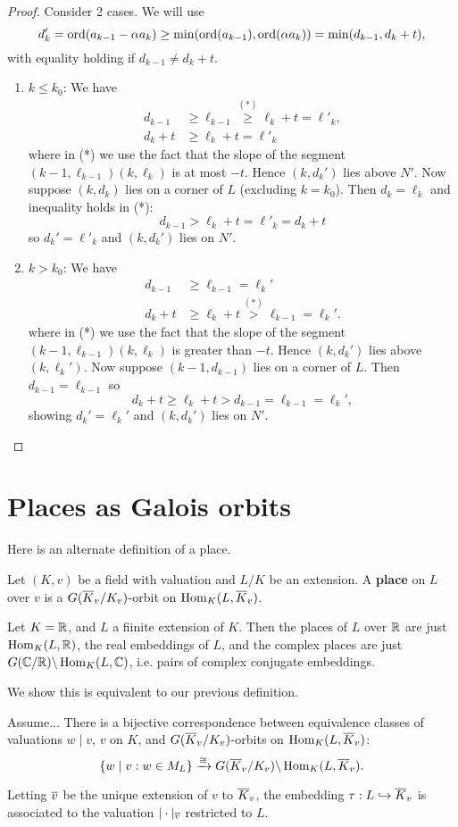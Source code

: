 \begin{proof}
Consider 2 cases. We will use 
\[
d_k'=\operatorname{ord}(a_{k-1}-\alpha a_{k})\ge 
\min(\operatorname{ord}(a_{k-1}),\operatorname{ord}(\alpha a_{k}))=\min(d_{k-1},d_k+t),
\]
with equality holding if $d_{k-1}\ne d_k+t$.
\begin{enumerate}
\item $k\le k_0$: We have
\begin{align*}
d_{k-1}& \ge \ell_{k-1}\stackrel{(*)}{\ge} \ell_k+t=\ell'_k,\\
d_k+t& \ge \ell_k+t= \ell'_k
\end{align*}
where in (*) we use the fact that the slope of the segment $(k-1,\ell_{k-1})(k,\ell_k)$ is at most $-t$. 
Hence $(k,d_k')$ lies above $N'$. Now suppose $(k,d_k)$ lies on a corner of $L$ (excluding $k=k_0$). Then $d_k=\ell_k$ and inequality holds in (*):
\[
d_{k-1}>\ell_k+t=\ell'_k=d_k+t
\]
so $d_k'=\ell'_k$ and $(k,d_k')$ lies on $N'$.
\item $k>k_0$: We have
\begin{align*}
d_{k-1}&\ge\ell_{k-1}=\ell_k'\\
d_{k}+t&\ge \ell_k+t\stackrel{(*)}{>} \ell_{k-1}=\ell_k'.
\end{align*}
where in (*) we use the fact that the slope of the segment $(k-1,\ell_{k-1})(k,\ell_k)$ is greater than $-t$. Hence $(k,d_k')$ lies above $(k,\ell_k')$. Now suppose $(k-1,d_{k-1})$ lies on a corner of $L$. Then $d_{k-1}=\ell_{k-1}$ so
\[
d_{k}+t\ge\ell_k+t>d_{k-1}=\ell_{k-1}=\ell_k',
\]
showing $d_k'=\ell_k'$ and $(k,d_k')$ lies on $N'$.\qedhere
\end{enumerate}
\end{proof}
%
\section{Places as Galois orbits}
Here is an alternate definition of a place.
\begin{df}
Let $(K,v)$ be a field with valuation and $L/K$ be an extension. A \textbf{place} on $L$ over $v$ is a $G(\overline{K}_v/K_v)$-orbit on $\operatorname{Hom}_K(L,\overline{K}_v)$.
\end{df}
\begin{ex}
Let $K=\mathbb{R}$, and $L$ a fiinite extension of $K$. Then the places of $L$ over $\mathbb{R}$ are just $\operatorname{Hom}_K(L,\mathbb{R})$, the real embeddings of $L$, and the complex places are just $G(\mathbb{C}/\mathbb{R})\backslash\operatorname{Hom}_K(L,\mathbb{C})$, i.e. pairs of complex conjugate embeddings.
\end{ex}
We show this is equivalent to our previous definition.
\begin{thm}
Assume...
There is a bijective correspondence between equivalence classes of valuations $w\mid v$, $v$ on $K$, and $G(\overline{K}_v/K_v)$-orbits on $\operatorname{Hom}_K(L,\overline{K}_v)$:
\[
\left\{{w\mid v}:{w\in M_L}\right\}\xrightarrow{\cong} G(\overline{K}_v/K_v)\backslash\operatorname{Hom}_K(L,\overline{K}_v).
\]

Letting $\overline{v}$ be the unique extension of $v$ to $\overline{K}_v$, 
the embedding $\tau:L\hookrightarrow \overline{K}_v$ is associated to the valuation $|\cdot|_{\overline{v}}$ restricted to $L$.
\end{thm}
%
